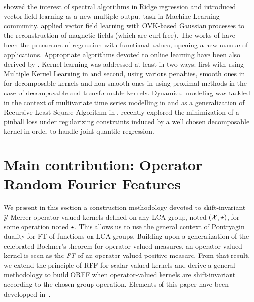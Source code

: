 \documentclass[twoside,11pt]{article}
\begin{document}
\paragraph{}
\citet{Macedo2008, Baldassare2012} showed the interest of spectral algorithms
in Ridge regression and introduced vector field learning as a new multiple
output task in Machine Learning community. \citet{Wahlstrom2013} applied vector
field learning with \acs{OVK}-based Gaussian processes to the reconstruction of
magnetic fields (which are curl-free).  The works of
\citet{Kadri_aistat10,kadri2015operator} have been the precursors of regression
with functional values, opening a new avenue of applications.  Appropriate
algorithms devoted to online learning have been also derived  by
\citet{audiffren2013online}.  Kernel learning was addressed at least in two
ways: first with using Multiple Kernel Learning in \citet{Kadri_nips2012} and
second, using various penalties, smooth ones in \citet{Dinuzzo2011,
ciliberto2015} for decomposable kernels and non smooth ones in
\citet{lim2015operator} using proximal methods in the case of decomposable and
transformable kernels.  Dynamical modeling was tackled in the context of
multivariate time series modelling in
\citet{lim2013okvar,Sindhwani2013,lim2015operator} and as a generalization of
Recursive Least Square Algorithm in \citet{amblard2015operator}.
\citet{sangnier2016joint} recently explored the minimization of a pinball loss
under regularizing constraints induced by a well chosen decomposable kernel in
order to handle joint quantile regression.


\section{Main contribution: Operator Random Fourier Features}
\label{sec:ORFF_construction}
We present in this section a construction methodology devoted to
shift-invariant $\mathcal{Y}$-Mercer operator-valued kernels defined on any
\acf{LCA} group, noted $(\mathcal{X}, \star)$, for some operation noted
$\star$. This allows us to use the general context of Pontryagin duality for
\acl{FT} of functions on \acs{LCA} groups. Building upon a generalization of
the celebrated Bochner's theorem for operator-valued measures, an
operator-valued kernel is seen as the \emph{\acl{FT}} of an operator-valued
positive measure. From that result, we extend the principle of \acs{RFF} for
scalar-valued kernels and derive a general methodology to build \acf{ORFF} when
operator-valued kernels are shift-invariant according to the chosen group
operation. Elements of this paper have been developped
in~\citet{brault2016random}.
\end{document}
